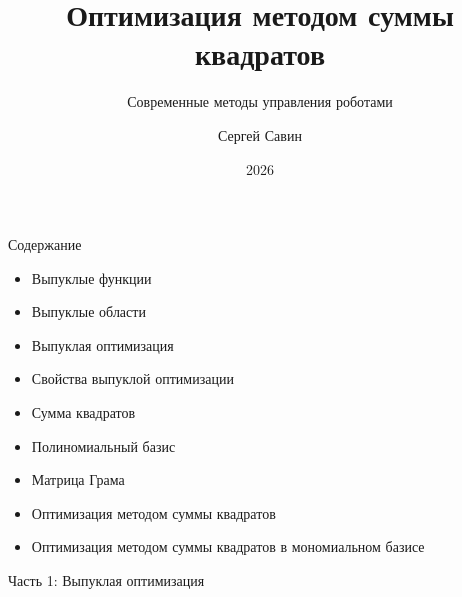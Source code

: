 \documentclass{beamer}
\subtitle{Современные методы управления роботами}
\author{Сергей Савин}
\date{2026}
\title{Оптимизация методом суммы квадратов}
\begin{document}
\maketitle

\begin{frame}{Содержание}
	\begin{itemize}
		\item Выпуклые функции
		\item Выпуклые области
		\item Выпуклая оптимизация
		\item Свойства выпуклой оптимизации
		\item Сумма квадратов
		\item Полиномиальный базис
		\item Матрица Грама
		\item Оптимизация методом суммы квадратов
		\item Оптимизация методом суммы квадратов в мономиальном базисе
	\end{itemize}
\end{frame}


\begin{frame}
	\begin{center}
		{\Large Часть 1: Выпуклая оптимизация}
	\end{center}
\end{frame}
\end{document}
